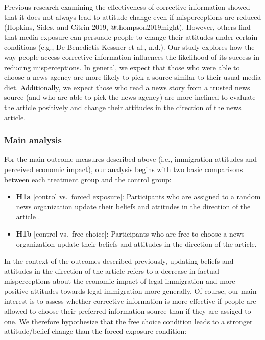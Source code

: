 \documentclass[]{article}
\providecommand{\tightlist}{%
  \setlength{\itemsep}{0pt}\setlength{\parskip}{0pt}}
\begin{document}
Previous research examining the effectiveness of corrective information
showed that it does not always lead to attitude change even if
misperceptions are reduced (Hopkins, Sides, and Citrin 2019,
@thompson2019might). However, others find that media exposure can
persuade people to change their attitudes under certain conditions
(e.g., De Benedictis-Kessner et al., n.d.). Our study explores how the
way people access corrective information influences the likelihood of
its success in reducing misperceptions. In general, we expect that those
who were able to choose a news agency are more likely to pick a source
similar to their usual media diet. Additionally, we expect those who
read a news story from a trusted news source (and who are able to pick
the news agency) are more inclined to evaluate the article positively
and change their attitudes in the direction of the news article.

\hypertarget{main-analysis}{%
\subsubsection{Main analysis}\label{main-analysis}}

For the main outcome measures described above (i.e., immigration
attitudes and perceived economic impact), our analysis begins with two
basic comparisons between each treatment group and the control group:

\begin{itemize}
\tightlist
\item
  \textbf{H1a} {[}control vs.~forced exposure{]}: Participants who are
  assigned to a random news organization update their beliefs and
  attitudes in the direction of the article .
\item
  \textbf{H1b} {[}control vs.~free choice{]}: Participants who are free
  to choose a news organization update their beliefs and attitudes in
  the direction of the article.
\end{itemize}

In the context of the outcomes described previously, updating beliefs
and attitudes in the direction of the article refers to a decrease in
factual misperceptions about the economic impact of legal immigration
and more positive attitudes towards legal immigration more generally. Of
course, our main interest is to assess whether corrective information is
more effective if people are allowed to choose their preferred
information source than if they are assiged to one. We therefore
hypothesize that the free choice condition leads to a stronger
attitude/belief change than the forced exposure condition:
\end{document}
